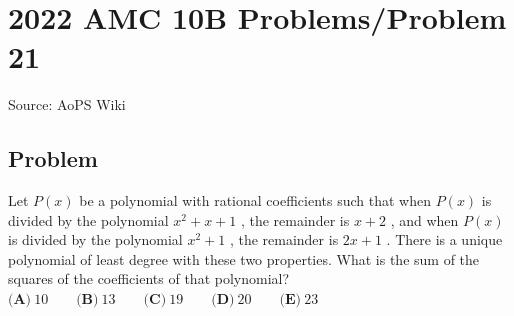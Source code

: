 \documentclass[12pt]{article}
\begin{document}
\section*{{2022 AMC 10B Problems/Problem 21}}
Source: AoPS Wiki

\subsection*{Problem}
Let $P(x)$ be a polynomial with rational coefficients such that when $P(x)$ is divided by the polynomial $x^2 + x + 1$ , the remainder is $x+2$ , and when $P(x)$ is divided by the polynomial $x^2+1$ , the remainder
is $2x+1$ . There is a unique polynomial of least degree with these two properties. What is the sum of
the squares of the coefficients of that polynomial? $\textbf{(A)}\ 10 \qquad\textbf{(B)}\ 13 \qquad\textbf{(C)}\ 19 \qquad\textbf{(D)}\ 20 \qquad\textbf{(E)}\ 23$
\end{document}
